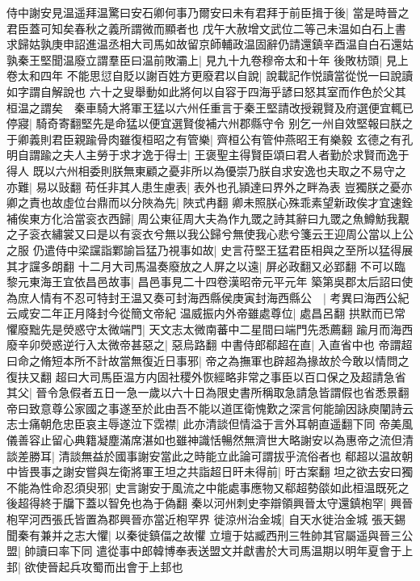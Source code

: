 侍中謝安見温遥拜温驚曰安石卿何事乃爾安曰未有君拜于前臣揖于後|{
	當是時晉之君臣蓋可知矣春秋之義所謂微而顯者也}
戊午大赦增文武位二等己未温如白石上書求歸姑孰庚申詔進温丞相大司馬如故留京師輔政温固辭仍請還鎮辛酉温自白石還姑孰秦王堅聞温廢立謂羣臣曰温前敗灞上|{
	見九十九卷穆帝太和十年}
後敗枋頭|{
	見上卷太和四年}
不能思愆自貶以謝百姓方更廢君以自說|{
	說載記作悦讀當從悦一曰說讀如字謂自解說也}
六十之叟舉動如此將何以自容于四海乎諺曰怒其室而作色於父其桓温之謂矣　秦車騎大將軍王猛以六州任重言于秦王堅請改授親賢及府選便宜輒已停寢|{
	騎奇寄翻堅先是命猛以便宜選賢俊補六州郡縣守令}
别乞一州自效堅報曰朕之于卿義則君臣親踰骨肉雖復桓昭之有管樂|{
	齊桓公有管仲燕昭王有樂毅}
玄德之有孔明自謂踰之夫人主勞于求才逸于得士|{
	王褒聖主得賢臣頌曰君人者勤於求賢而逸于得人}
既以六州相委則朕無東顧之憂非所以為優崇乃朕自求安逸也夫取之不易守之亦難|{
	易以䜴翻}
苟任非其人患生慮表|{
	表外也孔頴達曰界外之畔為表}
豈獨朕之憂亦卿之責也故虛位台鼎而以分陜為先|{
	陜式冉翻}
卿未照朕心殊乖素望新政俟才宜速銓補俟東方化洽當衮衣西歸|{
	周公東征周大夫為作九罭之詩其辭曰九罭之魚鱒魴我覯之子衮衣繡裳又曰是以有衮衣兮無以我公歸兮無使我心悲兮箋云王迎周公當以上公之服}
仍遣侍中梁讜詣鄴諭旨猛乃視事如故|{
	史言苻堅王猛君臣相與之至所以猛得展其才讜多朗翻}
十二月大司馬温奏廢放之人屏之以遠|{
	屏必政翻又必郢翻}
不可以臨黎元東海王宜依昌邑故事|{
	昌邑事見二十四卷漢昭帝元平元年}
築第吳郡太后詔曰使為庶人情有不忍可特封王温又奏可封海西縣侯庚寅封海西縣公　|{
	考異曰海西公紀云咸安二年正月降封今從簡文帝紀}
温威振内外帝雖處尊位|{
	處昌呂翻}
拱默而已常懼廢黜先是熒惑守太微端門|{
	天文志太微南蕃中二星間曰端門先悉薦翻}
踰月而海西廢辛卯熒惑逆行入太微帝甚惡之|{
	惡烏路翻}
中書侍郎郗超在直|{
	入直省中也}
帝謂超曰命之脩短本所不計故當無復近日事邪|{
	帝之為撫軍也辟超為掾故於今敢以情問之復扶又翻}
超曰大司馬臣温方内固社稷外恢經略非常之事臣以百口保之及超請急省其父|{
	晉令急假者五日一急一歲以六十日為限史書所稱取急請急皆謂假也省悉景翻}
帝曰致意尊公家國之事遂至於此由吾不能以道匡衛愧歎之深言何能諭因詠庾闡詩云志士痛朝危忠臣哀主辱遂泣下霑襟|{
	此亦清談但情溢于言外耳朝直遥翻下同}
帝美風儀善容止留心典籍凝塵滿席湛如也雖神識恬暢然無濟世大略謝安以為惠帝之流但清談差勝耳|{
	清談無益於國事謝安當此之時能立此論可謂拔乎流俗者也}
郗超以温故朝中皆畏事之謝安嘗與左衛將軍王坦之共詣超日旰未得前|{
	旴古案翻}
坦之欲去安曰獨不能為性命忍須臾邪|{
	史言謝安于風流之中能處事應物又郗超勢燄如此桓温既死之後超得終于牖下蓋以智免也為于偽翻}
秦以河州刺史李辯領興晉太守還鎮枹罕|{
	興晉枹罕河西張氏皆置為郡興晉亦當近枹罕界}
徙涼州治金城|{
	自天水徙治金城}
張天錫聞秦有兼并之志大懼|{
	以秦徙鎮偪之故懼}
立壇于姑臧西刑三牲帥其官屬遥與晉三公盟|{
	帥讀曰率下同}
遣從事中郎韓博奉表送盟文并獻書於大司馬温期以明年夏會于上邽|{
	欲使晉起兵攻蜀而出會于上邽也}

